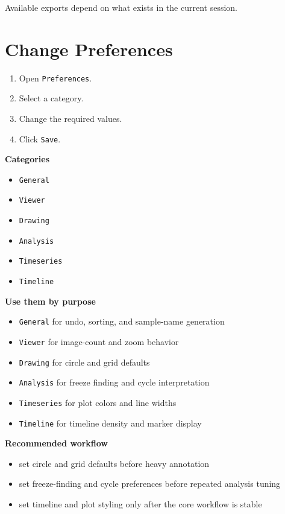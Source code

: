 \documentclass[
  9pt,
  letterpaper,
  oneside,
  open=any,
  DIV=15,
  parskip=half-,
  headings=big,
  numbers=noenddot
]{scrbook}
\newcommand{\manuallead}[1]{%
  \vspace{0.15em}%
  {\sffamily\bfseries\color{ManualBlue}#1}\par\nobreak\vspace{0.05em}%
}
\begin{document}
Available exports depend on what exists in the current session.


\section{Change Preferences}

\begin{enumerate}[leftmargin=*,itemsep=0.35em,topsep=0.4em]
\item Open \texttt{Preferences}.
\item Select a category.
\item Change the required values.
\item Click \texttt{Save}.
\end{enumerate}

\manuallead{Categories}

\begin{itemize}[leftmargin=*,itemsep=0.35em,topsep=0.4em]
\item \texttt{General}
\item \texttt{Viewer}
\item \texttt{Drawing}
\item \texttt{Analysis}
\item \texttt{Timeseries}
\item \texttt{Timeline}
\end{itemize}

\manuallead{Use them by purpose}

\begin{itemize}[leftmargin=*,itemsep=0.35em,topsep=0.4em]
\item \texttt{General} for undo, sorting, and sample-name generation
\item \texttt{Viewer} for image-count and zoom behavior
\item \texttt{Drawing} for circle and grid defaults
\item \texttt{Analysis} for freeze finding and cycle interpretation
\item \texttt{Timeseries} for plot colors and line widths
\item \texttt{Timeline} for timeline density and marker display
\end{itemize}

\manuallead{Recommended workflow}

\begin{itemize}[leftmargin=*,itemsep=0.35em,topsep=0.4em]
\item set circle and grid defaults before heavy annotation
\item set freeze-finding and cycle preferences before repeated analysis tuning
\item set timeline and plot styling only after the core workflow is stable
\end{itemize}
\end{document}
